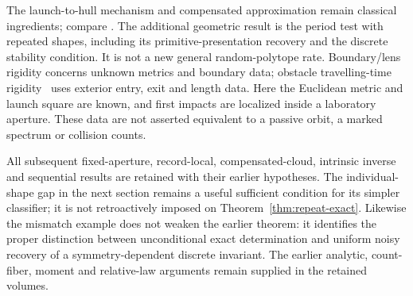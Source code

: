 The launch-to-hull mechanism and compensated approximation remain
classical ingredients; compare \cite{Schneider,PSSW}. The additional
geometric result is the period test with repeated shapes, including its
primitive-presentation recovery and the discrete stability condition.
It is not a new general random-polytope rate. Boundary/lens rigidity
\cite{SUV} concerns unknown metrics and boundary data; obstacle
travelling-time rigidity~\cite{GNS23a,GNS23b} uses exterior entry, exit
and length data. Here the Euclidean metric and launch square are known,
and first impacts are localized inside a laboratory aperture. These data
are not asserted equivalent to a passive orbit, a marked spectrum or
collision counts.

All subsequent fixed-aperture, record-local, compensated-cloud, intrinsic
inverse and sequential results are retained with their earlier hypotheses.
The individual-shape gap in the next section remains a useful sufficient
condition for its simpler classifier; it is not retroactively imposed on
Theorem~\ref{thm:repeat-exact}. Likewise the mismatch example does not
weaken the earlier theorem: it identifies the proper distinction between
unconditional exact determination and uniform noisy recovery of a
symmetry-dependent discrete invariant. The earlier analytic, count-fiber,
moment and relative-law arguments remain supplied in the retained volumes.
